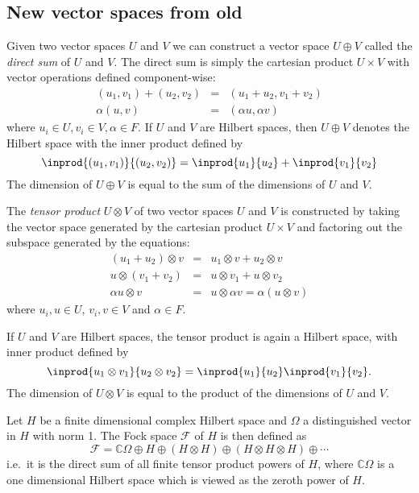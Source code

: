 \subsection{New vector spaces from old}
\begin{defn}
Given two vector spaces $U$ and $V$ we can construct a vector space $U \oplus V$ called the \emph{direct sum} of $U$ and $V$. The direct sum is simply the cartesian product $U \times V$ with vector operations defined component-wise:
\begin{eqnarray*}
(u_1,v_1) + (u_2,v_2) & = & (u_1+u_2,v_1+v_2)\\
\alpha(u,v) & = & (\alpha u, \alpha v)
\end{eqnarray*}
where $u_i \in U, v_i \in V, \alpha \in F$. If $U$ and $V$ are Hilbert spaces, then $U \oplus V$ denotes the Hilbert space with the inner product defined by
$$\inprod{(u_1,v_1)}{(u_2,v_2)} = \inprod{u_1}{u_2} + \inprod{v_1}{v_2}$$
The dimension of $U\oplus V$ is equal to the sum of the dimensions of $U$ and $V$.
\end{defn}
\begin{defn}

The \emph{tensor product} $U \otimes V$ of two vector spaces $U$ and $V$ is constructed by taking the vector space generated by the cartesian product $U \times V$ and factoring out the subspace generated by the equations:
\begin{eqnarray*}
(u_1 + u_2) \otimes v & = & u_1 \otimes v + u_2 \otimes v\\
u \otimes (v_1 + v_2) & = & u \otimes v_1 + u \otimes v_2\\
\alpha u\otimes v & =  &u \otimes \alpha v = \alpha(u \otimes v) 
\end{eqnarray*}
where $u_i,u \in U$, $v_i,v \in V$ and $\alpha \in F$.

If $U$ and $V$ are Hilbert spaces, the tensor product is again a Hilbert space, with inner product defined by
$$\inprod{u_1\otimes v_1}{u_2 \otimes v_2} = \inprod{u_1}{u_2}\inprod{v_1}{v_2}.$$
The dimension of $U \otimes V$ is equal to the product of the dimensions of $U$ and $V$.
\end{defn}
\begin{defn}
Let $H$ be a finite dimensional complex Hilbert space and $\Omega$ a distinguished vector in $H$ with norm 1. The Fock space $\mathcal{F}$ of $H$ is then defined as
$$\mathcal{F} = \mathbb{C}\Omega \oplus H \oplus (H \otimes H) \oplus (H \otimes H \otimes H) \oplus \cdots$$
i.e.~it is the direct sum of all finite tensor product powers of $H$, where $\mathbb{C}\Omega$ is a one dimensional Hilbert space which is viewed as the zeroth power of $H$.
\end{defn}

